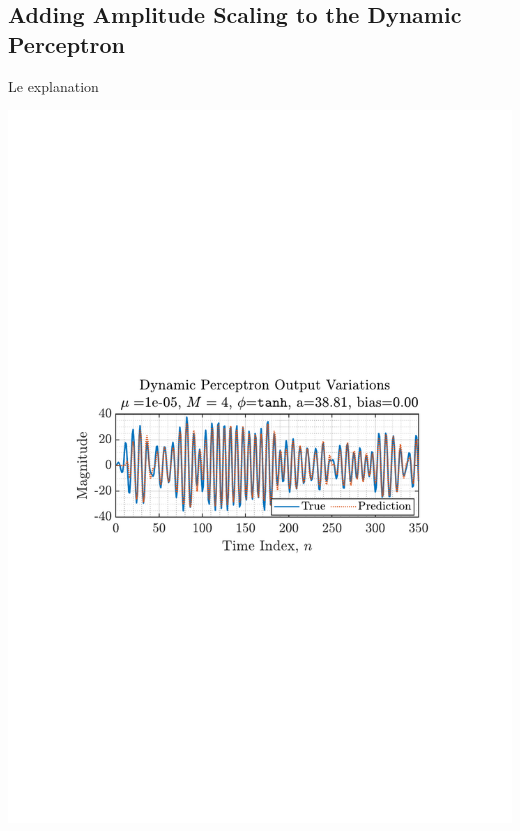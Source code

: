 \documentclass[12pt]{article}
\begin{document}
	\subsection{Adding Amplitude Scaling to the Dynamic Perceptron} \label{sec: 4-3-amplitude-dynamic-perc}
		\begin{minipage}[b]{0.49\textwidth}
			Le explanation
		\end{minipage}%
		\begin{minipage}{0.04\textwidth}
			\hspace*{0.04\textwidth}
		\end{minipage}%
		\begin{minipage}{0.49\textwidth}
			\centering
			\includegraphics[trim={2.2cm 11.2cm 3.15cm  11.2cm}, clip, width=\textwidth]{../MATLAB/figures/q4_3_fig01.pdf} 
			
			\captionsetup{justification=centering}
			\label{fig: 4-3}
		\end{minipage}%
\end{document}
